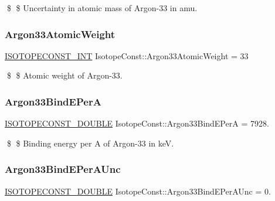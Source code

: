 \$ \$ Uncertainty in atomic mass of Argon-\/33 in amu. \mbox{\label{group___isotope_const-_argon-_ar33_ga8913b3c03a3ba9638c05959b92e856fd}} 
\subsubsection{\texorpdfstring{Argon33\+Atomic\+Weight}{Argon33AtomicWeight}}
{\footnotesize\ttfamily \mbox{\hyperlink{group___isotope_const-_macros_ga5f18360b3e99483a35c32d789e62621c}{I\+S\+O\+T\+O\+P\+E\+C\+O\+N\+S\+T\+\_\+\+I\+NT}} Isotope\+Const\+::\+Argon33\+Atomic\+Weight = 33}

\$ \$ Atomic weight of Argon-\/33. \mbox{\label{group___isotope_const-_argon-_ar33_gae38b5c1e73fdc85c6ec3d6b80ed1d7ec}} 
\subsubsection{\texorpdfstring{Argon33\+Bind\+E\+PerA}{Argon33BindEPerA}}
{\footnotesize\ttfamily \mbox{\hyperlink{group___isotope_const-_macros_ga8f45a7272ce02c0b4c65c44636ed719a}{I\+S\+O\+T\+O\+P\+E\+C\+O\+N\+S\+T\+\_\+\+D\+O\+U\+B\+LE}} Isotope\+Const\+::\+Argon33\+Bind\+E\+PerA = 7928.}

\$ \$ Binding energy per A of Argon-\/33 in keV. \mbox{\label{group___isotope_const-_argon-_ar33_ga34458eea9ea0254758362f2f3e0dd5aa}} 
\subsubsection{\texorpdfstring{Argon33\+Bind\+E\+Per\+A\+Unc}{Argon33BindEPerAUnc}}
{\footnotesize\ttfamily \mbox{\hyperlink{group___isotope_const-_macros_ga8f45a7272ce02c0b4c65c44636ed719a}{I\+S\+O\+T\+O\+P\+E\+C\+O\+N\+S\+T\+\_\+\+D\+O\+U\+B\+LE}} Isotope\+Const\+::\+Argon33\+Bind\+E\+Per\+A\+Unc = 0.}

